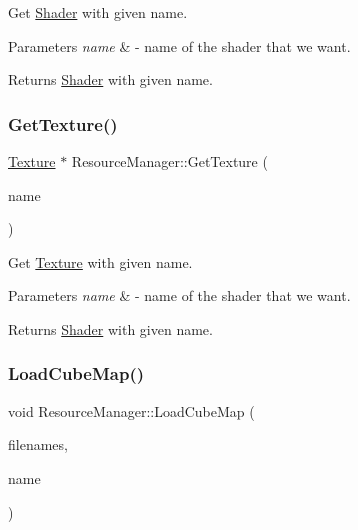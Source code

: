 Get \mbox{\hyperlink{class_shader}{Shader}} with given name. 


\begin{DoxyParams}{Parameters}
{\em name} & -\/ name of the shader that we want. \\
\hline
\end{DoxyParams}
\begin{DoxyReturn}{Returns}
\mbox{\hyperlink{class_shader}{Shader}} with given name. 
\end{DoxyReturn}
\mbox{\label{class_resource_manager_aa1456969a733c58bc47f372005699cbc}} 
\subsubsection{\texorpdfstring{GetTexture()}{GetTexture()}}
{\footnotesize\ttfamily \mbox{\hyperlink{class_texture}{Texture}} $\ast$ Resource\+Manager\+::\+Get\+Texture (\begin{DoxyParamCaption}\item[{std\+::string}]{name }\end{DoxyParamCaption})\hspace{0.3cm}{\ttfamily [static]}}



Get \mbox{\hyperlink{class_texture}{Texture}} with given name. 


\begin{DoxyParams}{Parameters}
{\em name} & -\/ name of the shader that we want. \\
\hline
\end{DoxyParams}
\begin{DoxyReturn}{Returns}
\mbox{\hyperlink{class_shader}{Shader}} with given name. 
\end{DoxyReturn}
\mbox{\label{class_resource_manager_aa1b2f4a63ed096bbcd1e3732078f35f6}} 
\subsubsection{\texorpdfstring{LoadCubeMap()}{LoadCubeMap()}}
{\footnotesize\ttfamily void Resource\+Manager\+::\+Load\+Cube\+Map (\begin{DoxyParamCaption}\item[{std\+::vector$<$ G\+Lchar $\ast$ $>$}]{filenames,  }\item[{std\+::string}]{name }\end{DoxyParamCaption})\hspace{0.3cm}{\ttfamily [static]}}



